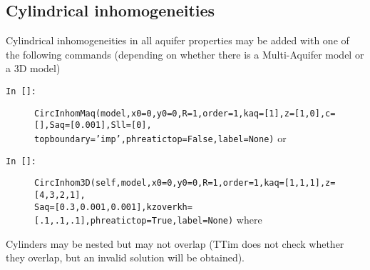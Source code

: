 \documentclass [10pt,letterpaper] {article}
\begin{document}
\subsection{Cylindrical inhomogeneities}
Cylindrical inhomogeneities in all aquifer properties may be added with one of the following commands (depending on whether there is a Multi-Aquifer model or a 3D model)
\begin{description}
\item[{\tt In []:}] {\tt CircInhomMaq(model,x0=0,y0=0,R=1,order=1,kaq=[1],z=[1,0],c=[],Saq=[0.001],Sll=[0],\\ topboundary='imp',phreatictop=False,label=None)} or
\item[{\tt In []:}] {\tt CircInhom3D(self,model,x0=0,y0=0,R=1,order=1,kaq=[1,1,1],z=[4,3,2,1],\\
Saq=[0.3,0.001,0.001],kzoverkh=[.1,.1,.1],phreatictop=True,label=None)} where
\end{description}
Cylinders may be nested but may not overlap (TTim does not check whether they overlap, but an invalid solution will be obtained).
\end{document}
